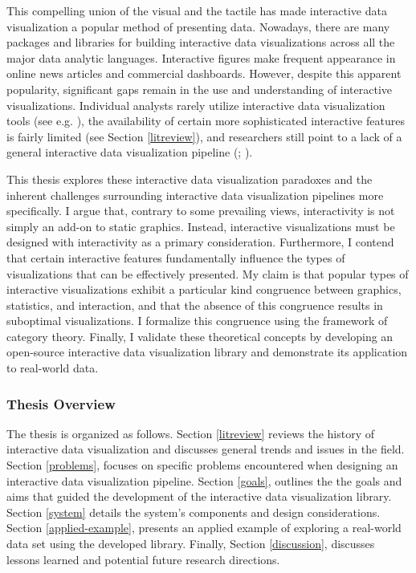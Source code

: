 \documentclass[
]{book}
\begin{document}
This compelling union of the visual and the tactile has made interactive data visualization a popular method of presenting data. Nowadays, there are many packages and libraries for building interactive data visualizations across all the major data analytic languages. Interactive figures make frequent appearance in online news articles and commercial dashboards. However, despite this apparent popularity, significant gaps remain in the use and understanding of interactive visualizations. Individual analysts rarely utilize interactive data visualization tools (see e.g. ), the availability of certain more sophisticated interactive features is fairly limited (see Section \ref{litreview}), and researchers still point to a lack of a general interactive data visualization pipeline (; ).

This thesis explores these interactive data visualization paradoxes and the inherent challenges surrounding interactive data visualization pipelines more specifically. I argue that, contrary to some prevailing views, interactivity is not simply an add-on to static graphics. Instead, interactive visualizations must be designed with interactivity as a primary consideration. Furthermore, I contend that certain interactive features fundamentally influence the types of visualizations that can be effectively presented. My claim is that popular types of interactive visualizations exhibit a particular kind congruence between graphics, statistics, and interaction, and that the absence of this congruence results in suboptimal visualizations. I formalize this congruence using the framework of category theory. Finally, I validate these theoretical concepts by developing an open-source interactive data visualization library and demonstrate its application to real-world data.

\subsubsection{Thesis Overview}\label{thesis-overview}

The thesis is organized as follows. Section \ref{litreview} reviews the history of interactive data visualization and discusses general trends and issues in the field. Section \ref{problems}, focuses on specific problems encountered when designing an interactive data visualization pipeline. Section \ref{goals}, outlines the the goals and aims that guided the development of the interactive data visualization library. Section \ref{system} details the system's components and design considerations. Section \ref{applied-example}, presents an applied example of exploring a real-world data set using the developed library. Finally, Section \ref{discussion}, discusses lessons learned and potential future research directions.
\end{document}
